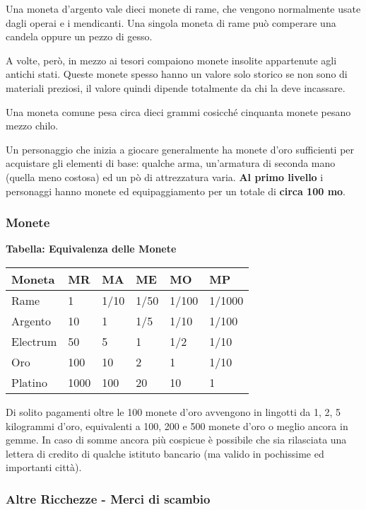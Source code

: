 \begin{multicols}{2}
Una moneta d'argento vale dieci monete di rame, che vengono normalmente usate dagli operai e i mendicanti. Una singola moneta di rame può comperare una candela oppure un pezzo di gesso.

A volte, però, in mezzo ai tesori compaiono monete insolite appartenute agli antichi stati. Queste monete spesso hanno un valore solo storico se non sono di materiali preziosi, il valore quindi dipende totalmente da chi la deve incassare.

Una moneta comune pesa circa dieci grammi cosicché cinquanta monete pesano mezzo chilo.

Un personaggio che inizia a giocare generalmente ha monete d'oro sufficienti per acquistare gli elementi di base: qualche arma, un'armatura di seconda mano (quella meno costosa) ed un pò di attrezzatura varia. \textbf{Al primo livello} i personaggi hanno monete ed equipaggiamento per un totale di \textbf{circa 100 mo}.

\subsubsection{Monete}

\textbf{Tabella: Equivalenza delle Monete}

\medskip

\noindent\begin{tabular}{llllll}

\textbf{Moneta} & \textbf{MR}&\textbf{MA}&\textbf{ME}&\textbf{MO}&\textbf{MP}\\
\toprule
Rame& 1& 1/10& 1/50& 1/100& 1/1000\\
Argento & 10 & 1 & 1/5& 1/10 & 1/100\\
Electrum & 50 & 5 & 1 & 1/2& 1/10\\
Oro & 100 & 10 & 2& 1 & 1/10\\
Platino & 1000 & 100 & 20& 10 & 1
\end{tabular}

\medskip

Di solito pagamenti oltre le 100 monete d'oro avvengono in lingotti da 1, 2, 5 kilogrammi d'oro, equivalenti a 100, 200 e 500 monete d'oro o meglio ancora in gemme. In caso di somme ancora più cospicue è possibile che sia rilasciata una lettera di credito di qualche istituto bancario (ma valido in pochissime ed importanti città).

\subsubsection{Altre Ricchezze - Merci di scambio}


\end{multicols}
